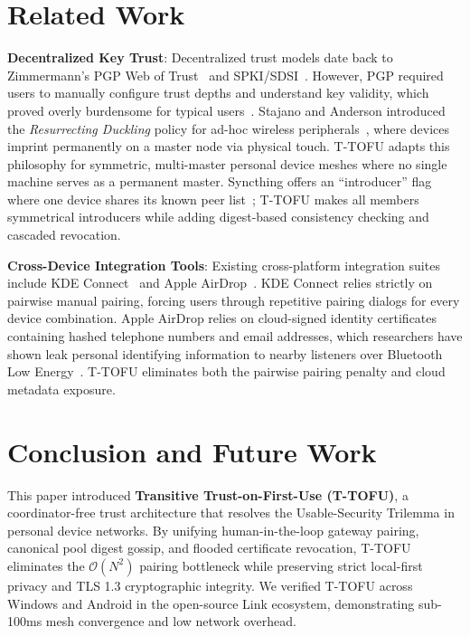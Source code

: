 \documentclass[conference]{IEEEtran}
\begin{document}
\section{Related Work}
\textbf{Decentralized Key Trust}: Decentralized trust models date back to Zimmermann's PGP Web of Trust~\cite{zimmermann1995official} and SPKI/SDSI~\cite{ellison1999spki}. However, PGP required users to manually configure trust depths and understand key validity, which proved overly burdensome for typical users~\cite{whitten1999johnny}. Stajano and Anderson introduced the \textit{Resurrecting Duckling} policy for ad-hoc wireless peripherals~\cite{stajano2000resurrecting}, where devices imprint permanently on a master node via physical touch. T-TOFU adapts this philosophy for symmetric, multi-master personal device meshes where no single machine serves as a permanent master. Syncthing offers an ``introducer'' flag where one device shares its known peer list~\cite{syncthing_doc}; T-TOFU makes all members symmetrical introducers while adding digest-based consistency checking and cascaded revocation.

\textbf{Cross-Device Integration Tools}: Existing cross-platform integration suites include KDE Connect~\cite{kdeconnect} and Apple AirDrop~\cite{heinrich2021privatedrop}. KDE Connect relies strictly on pairwise manual pairing, forcing users through repetitive pairing dialogs for every device combination. Apple AirDrop relies on cloud-signed identity certificates containing hashed telephone numbers and email addresses, which researchers have shown leak personal identifying information to nearby listeners over Bluetooth Low Energy~\cite{heinrich2021privatedrop,celosia2020discontinued}. T-TOFU eliminates both the pairwise pairing penalty and cloud metadata exposure.

\section{Conclusion and Future Work}
This paper introduced \textbf{Transitive Trust-on-First-Use (T-TOFU)}, a coordinator-free trust architecture that resolves the Usable-Security Trilemma in personal device networks. By unifying human-in-the-loop gateway pairing, canonical pool digest gossip, and flooded certificate revocation, T-TOFU eliminates the $\mathcal{O}(N^2)$ pairing bottleneck while preserving strict local-first privacy and TLS 1.3 cryptographic integrity. We verified T-TOFU across Windows and Android in the open-source Link ecosystem, demonstrating sub-100ms mesh convergence and low network overhead.
\end{document}
